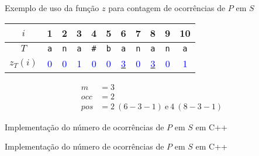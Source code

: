 \begin{frame}[fragile]{Exemplo de uso da função $z$ para contagem de ocorrências de $P$ em $S$}

    \begin{center}
    \begin{large}
    \begin{tabular}{c|cccccccccc}
        $i$ & 1 & 2 & 3 & 4 & 5 & 6 & 7 & 8 & 9 & 10 \\
        \hline
        $T$
& \texttt{\textcolor{red!80!black}{a}} 
& \texttt{\textcolor{red!80!black}{n}} 
& \texttt{\textcolor{red!80!black}{a}} 
& \texttt{\textcolor{red!80!black}{\#}} 
& \texttt{\textcolor{red!80!black}{b}} 
& \texttt{\textcolor{red!80!black}{a}} 
& \texttt{\textcolor{red!80!black}{n}} 
& \texttt{\textcolor{red!80!black}{a}} 
& \texttt{\textcolor{red!80!black}{n}} 
& \texttt{\textcolor{red!80!black}{a}} 
\\
        $z_T(i)$
& \textcolor{blue}{0} 
& \textcolor{blue}{0} 
& \textcolor{blue}{1} 
& \textcolor{blue}{0} 
& \textcolor{blue}{0} 
& \underline{\textcolor{blue}{3}}
& \textcolor{blue}{0} 
& \underline{\textcolor{blue}{3}}
& \textcolor{blue}{0} 
& \textcolor{blue}{1} 
\\
    \end{tabular}
    \end{large}
    \end{center}

    \begin{align*}
        m &= 3 \\
        occ &= 2 \\
        pos &= 2\ (6 - 3 - 1)\ \mbox{e}\ 4\ (8 - 3 - 1)
    \end{align*}
\end{frame}

\begin{frame}[fragile]{Implementação do número de ocorrências de $P$ em $S$ em C++}
\end{frame}

\begin{frame}[fragile]{Implementação do número de ocorrências de $P$ em $S$ em C++}
\end{frame}

